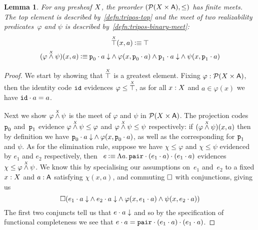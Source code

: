 \documentclass[11pt]{article}
\newtheorem{lemm}[thrm]{Lemma}
\begin{document}
\begin{lemm}\label{lemm:tripos-finite-meets}
  For any presheaf \(X\), the preorder \((\mathcal{P}{({X}\times{\ensuremath{\mathsf{A}}})}, \leq)\) has finite
  meets.
  The top element is described by~\ref{defn:tripos-top} and the meet of two
  realizability predicates~\(\varphi\) and \(\psi\) is described
  by~\ref{defn:tripos-binary-meet}:
  \begin{gather}
    \TTop{\X}(x,a)
    \IsDefined
    \ITop
    \label{defn:tripos-top}
    \\
    (\TAnd{\varphi}{\psi}{\X})(x,a)
    \IsDefined
    \IAnd%
      {\IAnd{\ITotal{\IAp{\IFstCode}{a}}}{\varphi(x,\IAp{\IFstCode}{a})}}%
      {\IAnd{\ITotal{\IAp{\ISndCode}{a}}}{\psi(x,\IAp{\ISndCode}{a})}}
    \label{defn:tripos-binary-meet}
  \end{gather}
\end{lemm}
\begin{proof}
  We start by showing that \(\overset{\scriptscriptstyle X}{\top}\) is a greatest element.
  Fixing \(\varphi:\mathcal{P}{({X}\times{\ensuremath{\mathsf{A}}})}\), then the identity code \(\texttt{id}\)
  evidences \(\varphi \leq \overset{\scriptscriptstyle X}{\top}\), as for all \(x : X\) and
  \(a \in \varphi(x)\) we have \({\texttt{id}}\cdot{a} = a\).

  Next we show \({\varphi}\overset{\scriptscriptstyle X}{\land}{\psi}\) is the meet of \(\varphi\) and
  \(\psi\) in \(\mathcal{P}{({X}\times{\ensuremath{\mathsf{A}}})}\).
  The projection codes~\(\texttt{p}_0\) and~\(\texttt{p}_1\) evidence
  \({\varphi}\overset{\scriptscriptstyle X}{\land}{\psi}\leq\varphi\) and
  \({\varphi}\overset{\scriptscriptstyle X}{\land}{\psi}\leq\psi\) respectively:
  if \(({\varphi}\overset{\scriptscriptstyle X}{\land}{\psi})(x,a)\) then by definition we have
  \({{{\texttt{p}_0}\cdot{a}}\downarrow}\land{\varphi(x,{\texttt{p}_0}\cdot{a})}\), as
  well as the corresponding for \(\texttt{p}_1\) and \(\psi\).
  As for the elimination rule, suppose we have \(\chi\leq\varphi\) and
  \(\chi\leq\psi\) evidenced by \(e_{1}\) and \(e_{2}\) respectively,
  then~%
  \(
    e \mathbin{\vcentcolon\equiv}
    \Lambda{a}.\,{{{\texttt{pair}}\cdot{({e_{1}}\cdot{a})}}\cdot{({e_{1}}\cdot{a})}}
  \)
  evidences \(\chi\leq{\varphi}\overset{\scriptscriptstyle X}{\land}{\psi}\).
  We know this by specialising our assumptions on~\(e_{1}\) and~\(e_{2}\) to a
  fixed \(x:X\) and \(a:\mathsf{A}\) satisfying \(\chi(x,a)\), and commuting
  \(\Box\) with conjunctions, giving us
  \[
    \Box{
      ({
        {{{e_{1}}\cdot{a}}\downarrow}\land{{{e_{2}}\cdot{a}}\downarrow}
      }\land{
        {\varphi(x,{e_{1}}\cdot{a})}\land{\psi(x,{e_{2}}\cdot{a})}
      })
    }
  \]
  The first two conjuncts tell us that \({{e}\cdot{a}}\downarrow\) and so by the
  specification of functional completeness we see that
  \({e}\cdot{a} = {{\texttt{pair}}\cdot{({e_{1}}\cdot{a})}}\cdot{({e_{1}}\cdot{a})}\).
\end{proof}
\end{document}
